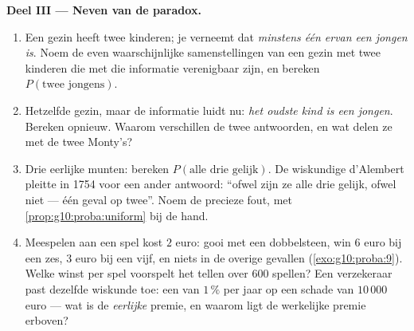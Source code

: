 \begin{problem}
\medskip
\noindent\textbf{Deel III --- Neven van de paradox.}
\begin{enumerate}[resume]
  \item Een gezin heeft twee kinderen; je verneemt dat \emph{minstens één
        ervan een jongen is}. Noem de even waarschijnlijke samenstellingen
        van een gezin met twee kinderen die met die informatie verenigbaar
        zijn, en bereken $P(\text{twee jongens})$.
  \item Hetzelfde gezin, maar de informatie luidt nu: \emph{het oudste kind
        is een jongen}. Bereken opnieuw. Waarom verschillen de twee
        antwoorden, en wat delen ze met de twee Monty's?
  \item Drie eerlijke munten: bereken $P(\text{alle drie gelijk})$. De
        wiskundige d'Alembert pleitte in 1754 voor een ander antwoord: ``ofwel
        zijn ze alle drie gelijk, ofwel niet --- één geval op twee''. Noem de
        precieze fout, met \cref{prop:g10:proba:uniform} bij de hand.
  \item Meespelen aan een spel kost $2$ euro: gooi met een dobbelsteen, win
        $6$ euro bij een zes, $3$ euro bij een vijf, en niets in de overige
        gevallen (\cref{exo:g10:proba:9}). Welke  winst per spel
        voorspelt het tellen over $600$ spellen? Een verzekeraar past
        dezelfde wiskunde toe: een  van $1\,\%$ per jaar op een schade van
        $10\,000$ euro --- wat is de \emph{eerlijke} premie, en waarom ligt de
        werkelijke premie erboven?
\end{enumerate}


\end{problem}
